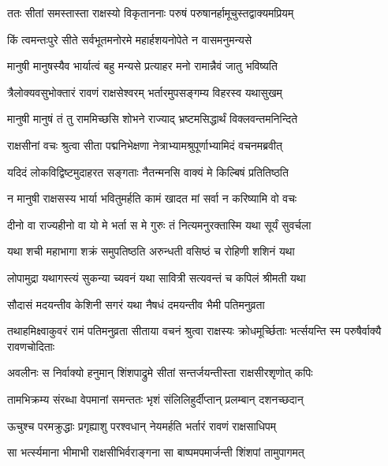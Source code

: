 
\twolineshloka
{ततः सीतां समस्तास्ता राक्षस्यो विकृताननाः}
{परुषं परुषानर्हामूचुस्तद्वाक्यमप्रियम्} %

\twolineshloka
{किं त्वमन्तःपुरे सीते सर्वभूतमनोरमे}
{महार्हशयनोपेते न वासमनुमन्यसे} %

\twolineshloka
{मानुषी मानुषस्यैव भार्यात्वं बहु मन्यसे}
{प्रत्याहर मनो रामान्नैवं जातु भविष्यति} %

\twolineshloka
{त्रैलोक्यवसुभोक्तारं रावणं राक्षसेश्वरम्}
{भर्तारमुपसङ्गम्य विहरस्व यथासुखम्} %

\twolineshloka
{मानुषी मानुषं तं तु राममिच्छसि शोभने}
{राज्याद् भ्रष्टमसिद्धार्थं विक्लवन्तमनिन्दिते} %

\twolineshloka
{राक्षसीनां वचः श्रुत्वा सीता पद्मनिभेक्षणा}
{नेत्राभ्यामश्रुपूर्णाभ्यामिदं वचनमब्रवीत्} %

\twolineshloka
{यदिदं लोकविद्विष्टमुदाहरत सङ्गताः}
{नैतन्मनसि वाक्यं मे किल्बिषं प्रतितिष्ठति} %

\twolineshloka
{न मानुषी राक्षसस्य भार्या भवितुमर्हति}
{कामं खादत मां सर्वा न करिष्यामि वो वचः} %

\twolineshloka
{दीनो वा राज्यहीनो वा यो मे भर्ता स मे गुरुः}
{तं नित्यमनुरक्तास्मि यथा सूर्यं सुवर्चला} %

\twolineshloka
{यथा शची महाभागा शक्रं समुपतिष्ठति}
{अरुन्धती वसिष्ठं च रोहिणी शशिनं यथा} %

\twolineshloka
{लोपामुद्रा यथागस्त्यं सुकन्या च्यवनं यथा}
{सावित्री सत्यवन्तं च कपिलं श्रीमती यथा} %

\twolineshloka
{सौदासं मदयन्तीव केशिनी सगरं यथा}
{नैषधं दमयन्तीव भैमी पतिमनुव्रता} %

\threelineshloka
{तथाहमिक्ष्वाकुवरं रामं पतिमनुव्रता}
{सीताया वचनं श्रुत्वा राक्षस्यः क्रोधमूर्च्छिताः}
{भर्त्सयन्ति स्म परुषैर्वाक्यै रावणचोदिताः} %

\twolineshloka
{अवलीनः स निर्वाक्यो हनुमान् शिंशपाद्रुमे}
{सीतां सन्तर्जयन्तीस्ता राक्षसीरशृणोत् कपिः} %

\twolineshloka
{तामभिक्रम्य संरब्धा वेपमानां समन्ततः}
{भृशं संलिलिहुर्दीप्तान् प्रलम्बान् दशनच्छदान्} %

\twolineshloka
{ऊचुश्च परमक्रुद्धाः प्रगृह्याशु परश्वधान्}
{नेयमर्हति भर्तारं रावणं राक्षसाधिपम्} %

\twolineshloka
{सा भर्त्स्यमाना भीमाभी राक्षसीभिर्वराङ्गना}
{सा बाष्पमपमार्जन्ती शिंशपां तामुपागमत्} %

